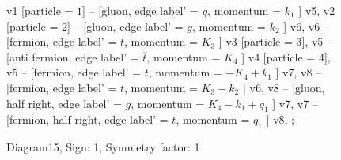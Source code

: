 \documentclass{revtex4}
\begin{document}
\begin{figure}[!htb]
\begin{center}
{    %
v1 [particle = \(1\)] -- [gluon, edge label' = \(g\), momentum = \(k_{1}\) ] v5, 
v2 [particle = \(2\)] -- [gluon, edge label' = \(g\), momentum = \(k_{2}\) ] v6, 
v6 -- [fermion, edge label' = \(t\), momentum = \(K_{3}\) ] v3 [particle = \(3\)], 
v5 -- [anti fermion, edge label' = \(\overline{t}\), momentum = \(K_{4}\) ] v4 [particle = \(4\)], 
v5 -- [fermion, edge label' = \(t\), momentum = \(-K_{4} + k_{1}\) ] v7, 
v8 -- [fermion, edge label' = \(t\), momentum = \(K_{3} - k_{2}\) ] v6, 
v8 -- [gluon, half right, edge label' = \(g\), momentum = \(K_{4} - k_{1} + q_{1}\) ] v7, 
v7 -- [fermion, half right, edge label' = \(t\), momentum = \(q_{1}\) ] v8, 
};
\end{center}
\caption{Diagram15, Sign: 1, Symmetry factor: 1}
\end{figure}
\newpage
\end{document}
